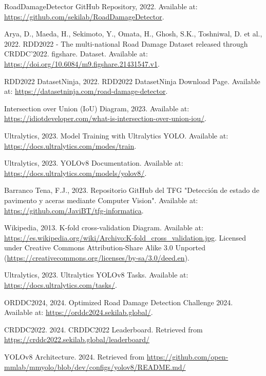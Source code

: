 \begin{thebibliography}{99}
        RoadDamageDetector GitHub Repository, 2022. Available at: \url{https://github.com/sekilab/RoadDamageDetector}.

        Arya, D., Maeda, H., Sekimoto, Y., Omata, H., Ghosh, S.K., Toshniwal, D. et al., 2022. RDD2022 - The multi-national Road Damage Dataset released through CRDDC'2022. figshare. Dataset. Available at: \url{https://doi.org/10.6084/m9.figshare.21431547.v1}.

        RDD2022 DatasetNinja, 2022. RDD2022 DatasetNinja Download Page. Available at: \url{https://datasetninja.com/road-damage-detector}.

        Intersection over Union (IoU) Diagram, 2023. Available at: \url{https://idiotdeveloper.com/what-is-intersection-over-union-iou/}.

        Ultralytics, 2023. Model Training with Ultralytics YOLO. Available at: \url{https://docs.ultralytics.com/modes/train}.

        Ultralytics, 2023. YOLOv8 Documentation. Available at: \url{https://docs.ultralytics.com/models/yolov8/}.

        Barranco Tena, F.J., 2023. Repositorio GitHub del TFG "Detección de estado de pavimento y aceras mediante Computer Vision". Available at: \url{https://github.com/JaviBT/tfg-informatica}.

        Wikipedia, 2013. K-fold cross-validation Diagram. Available at: \url{https://es.wikipedia.org/wiki/Archivo:K-fold_cross_validation.jpg}. Licensed under Creative Commons Attribution-Share Alike 3.0 Unported (\url{https://creativecommons.org/licenses/by-sa/3.0/deed.en}).

        Ultralytics, 2023. Ultralytics YOLOv8 Tasks. Available at: \url{https://docs.ultralytics.com/tasks/}.

        ORDDC2024, 2024. Optimized Road Damage Detection Challenge 2024. Available at: \url{https://orddc2024.sekilab.global/}.

        CRDDC2022. 2024. CRDDC2022 Leaderboard. Retrieved from \url{https://crddc2022.sekilab.global/leaderboard/}
    
        YOLOv8 Architecture. 2024. Retrieved from \url{https://github.com/open-mmlab/mmyolo/blob/dev/configs/yolov8/README.md/}


        
\end{thebibliography}  